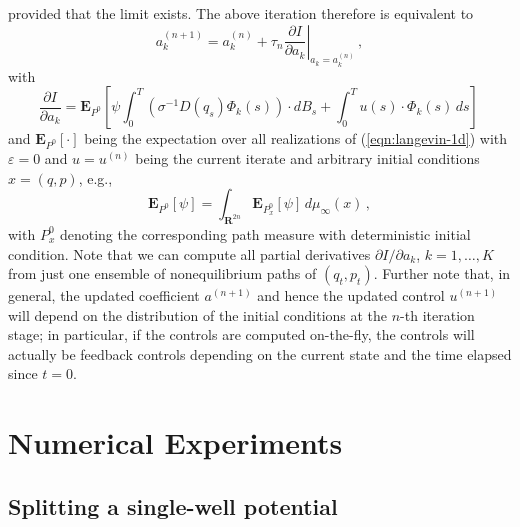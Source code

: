 \documentclass[]{tMPH2e}
\newcommand{\R}{{\mathbf R}}
\newcommand{\eps}{\varepsilon}
\newcommand{\bE}{{\mathbf E}}
\begin{document}
provided that the limit exists. The above iteration therefore is equivalent to
\begin{equation}\label{gd}
a_{k}^{(n+1)} = a_{k}^{(n)} + \tau_{n}\left.\frac{\partial I}{\partial a_{k}}\right|_{a_{k}=a_{k}^{(n)}}\,,
\end{equation}
with
\begin{equation}\label{dida}
\frac{\partial I}{\partial a_{k}} = \bE_{P^0}\left[\psi\int_{0}^{T}(\sigma^{-1}D(q_{s})\Phi_{k}(s))\cdot dB_{s} + \int_{0}^{T}u(s)\cdot\Phi_{k}(s)\,ds \right] \,
\end{equation}
and $\bE_{P^0}[\cdot]$ being the expectation over all realizations of (\ref{eqn:langevin-1d}) with $\eps=0$ and $u=u^{(n)}$ being the current iterate and arbitrary initial conditions $x=(q,p)$, e.g., 
\[
\bE_{P^{0}}[\psi] = \int_{\R^{2n}}\bE_{P^{0}_{x}}[\psi]\,d\mu_{\infty}(x) \,,
\]
with $P_{x}^{0}$ denoting the corresponding path measure with deterministic initial condition. Note that we can compute all partial derivatives $\partial I/\partial a_k$, $k=1,\ldots,K$ from just one ensemble of nonequilibrium paths of $(q_{t},p_{t})$. Further note that, in general, the updated coefficient $a^{(n+1)}$ and hence the updated control $u^{(n+1)}$ will depend on the distribution of the initial conditions at the $n$-th iteration stage; in particular, if the controls are computed on-the-fly, the controls will actually be feedback controls depending on the current state and the time elapsed since $t=0$.    





\section{Numerical Experiments}

\subsection{Splitting a single-well potential}
\end{document}
